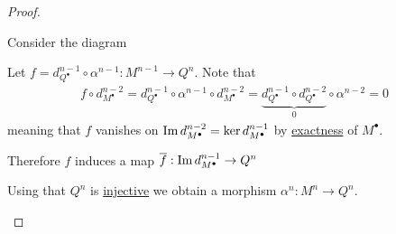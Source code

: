 \documentclass[../../../main]{subfiles}
\begin{document}
\begin{proof}
\begin{itemize}
          Consider the diagram
          \begin{center}
          \end{center}
          Let \(f = d_{Q^{\bullet}}^{n-1} \circ \alpha^{n-1}: M^{n-1} \to Q^{n}\).
          Note that
          \begin{align*}
            f \circ d_{M^{\bullet}}^{n-2} = d_{Q^{\bullet}}^{n-1} \circ \alpha^{n-1} \circ d_{M^{\bullet}}^{n-2} =  \underbrace{d_{Q^{\bullet}}^{n-1} \circ d_{Q^{\bullet}}^{n-2}}_{0} \circ \alpha^{n-2} = 0
          \end{align*}
          meaning that \(f\) vanishes on \(\operatorname*{Im} d_{M^{\bullet}}^{n-2} = \ker d_{M^{\bullet}}^{n-1}\) by \hyperref[def:exact-complex]{exactness} of \(M^{\bullet}\).

          Therefore \(f\) induces a map \(\overline{f}: \operatorname*{Im} d_{M^{\bullet}}^{n-1} \to Q^{n}\)
          \begin{center}
          \end{center}
          Using that \(Q^{n}\) is \hyperref[def:injective-projective-object]{injective} we obtain a morphism \(\alpha^{n}: M^{n} \to Q^{n}\).
  \end{itemize}
\end{proof}
\end{document}
